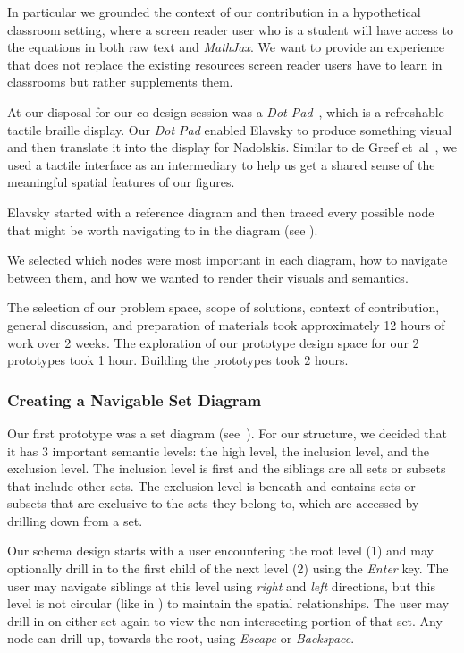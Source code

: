 \documentclass[12pt]{cmuthesis}
\newcommand{\ea}{{et~al\xperiod}\xspace}
\begin{document}
In particular we grounded the context of our contribution in a hypothetical classroom setting, where a screen reader user who is a student will have access to the equations in both raw text and \textit{MathJax}. We want to provide an experience that does not replace the existing resources screen reader users have to learn in classrooms but rather supplements them.

At our disposal for our co-design session was a \textit{Dot Pad}~\cite{Dot2020Dot}, which is a refreshable tactile braille display. Our \textit{Dot Pad} enabled Elavsky to produce something visual and then translate it into the display for Nadolskis. Similar to de Greef \ea~\cite{deGreef2021Interdependent}, we used a tactile interface as an intermediary to help us get a shared sense of the meaningful spatial features of our figures.

Elavsky started with a reference diagram and then traced every possible node that might be worth navigating to in the diagram (see ).

We selected which nodes were most important in each diagram, how to navigate between them, and how we wanted to render their visuals and semantics.

The selection of our problem space, scope of solutions, context of contribution, general discussion, and preparation of materials took approximately 12 hours of work over 2 weeks. The exploration of our prototype design space for our 2 prototypes took 1 hour. Building the prototypes took 2 hours.

\subsubsection{Creating a Navigable Set Diagram}

Our first prototype was a set diagram (see~). For our structure, we decided that it has 3 important semantic levels: the high level, the inclusion level, and the exclusion level. The inclusion level is first and the siblings are all sets or subsets that include other sets. The exclusion level is beneath and contains sets or subsets that are exclusive to the sets they belong to, which are accessed by drilling down from a set. 

Our schema design starts with a user encountering the root level (1) and may optionally drill in to the first child of the next level (2) using the \textit{Enter} key. The user may navigate siblings at this level using \textit{right} and \textit{left} directions, but this level is not circular (like in ) to maintain the spatial relationships. The user may drill in on either set again to view the non-intersecting portion of that set. Any node can drill up, towards the root, using \textit{Escape} or \textit{Backspace}.
\end{document}
